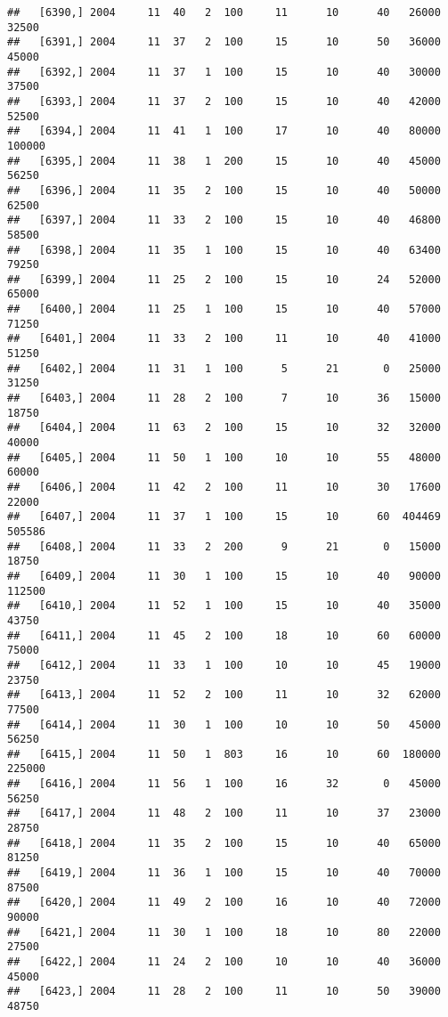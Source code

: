 \documentclass{article}\usepackage[]{graphicx}\usepackage[]{color}
\makeatletter
\newenvironment{kframe}{%
 \def\at@end@of@kframe{}%
 \ifinner\ifhmode%
  \def\at@end@of@kframe{\end{minipage}}%
  \begin{minipage}{\columnwidth}%
 \fi\fi%
 \def\FrameCommand##1{\hskip\@totalleftmargin \hskip-\fboxsep
 \colorbox{shadecolor}{##1}\hskip-\fboxsep
     \hskip-\linewidth \hskip-\@totalleftmargin \hskip\columnwidth}%
 \MakeFramed {\advance\hsize-\width
   \@totalleftmargin\z@ \linewidth\hsize
   \@setminipage}}%
 {\par\unskip\endMakeFramed%
 \at@end@of@kframe}
\newenvironment{knitrout}{}{} %
\makeatother
\begin{document}
\begin{knitrout}
\begin{kframe}
\begin{verbatim}
##   [6390,] 2004     11  40   2  100     11      10      40   26000   32500
##   [6391,] 2004     11  37   2  100     15      10      50   36000   45000
##   [6392,] 2004     11  37   1  100     15      10      40   30000   37500
##   [6393,] 2004     11  37   2  100     15      10      40   42000   52500
##   [6394,] 2004     11  41   1  100     17      10      40   80000  100000
##   [6395,] 2004     11  38   1  200     15      10      40   45000   56250
##   [6396,] 2004     11  35   2  100     15      10      40   50000   62500
##   [6397,] 2004     11  33   2  100     15      10      40   46800   58500
##   [6398,] 2004     11  35   1  100     15      10      40   63400   79250
##   [6399,] 2004     11  25   2  100     15      10      24   52000   65000
##   [6400,] 2004     11  25   1  100     15      10      40   57000   71250
##   [6401,] 2004     11  33   2  100     11      10      40   41000   51250
##   [6402,] 2004     11  31   1  100      5      21       0   25000   31250
##   [6403,] 2004     11  28   2  100      7      10      36   15000   18750
##   [6404,] 2004     11  63   2  100     15      10      32   32000   40000
##   [6405,] 2004     11  50   1  100     10      10      55   48000   60000
##   [6406,] 2004     11  42   2  100     11      10      30   17600   22000
##   [6407,] 2004     11  37   1  100     15      10      60  404469  505586
##   [6408,] 2004     11  33   2  200      9      21       0   15000   18750
##   [6409,] 2004     11  30   1  100     15      10      40   90000  112500
##   [6410,] 2004     11  52   1  100     15      10      40   35000   43750
##   [6411,] 2004     11  45   2  100     18      10      60   60000   75000
##   [6412,] 2004     11  33   1  100     10      10      45   19000   23750
##   [6413,] 2004     11  52   2  100     11      10      32   62000   77500
##   [6414,] 2004     11  30   1  100     10      10      50   45000   56250
##   [6415,] 2004     11  50   1  803     16      10      60  180000  225000
##   [6416,] 2004     11  56   1  100     16      32       0   45000   56250
##   [6417,] 2004     11  48   2  100     11      10      37   23000   28750
##   [6418,] 2004     11  35   2  100     15      10      40   65000   81250
##   [6419,] 2004     11  36   1  100     15      10      40   70000   87500
##   [6420,] 2004     11  49   2  100     16      10      40   72000   90000
##   [6421,] 2004     11  30   1  100     18      10      80   22000   27500
##   [6422,] 2004     11  24   2  100     10      10      40   36000   45000
##   [6423,] 2004     11  28   2  100     11      10      50   39000   48750

\end{verbatim}
\end{kframe}
\end{knitrout}
\end{document}
